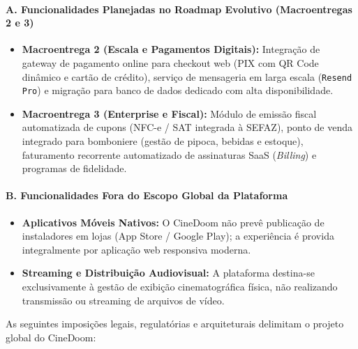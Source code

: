 \paragraph{A. Funcionalidades Planejadas no Roadmap Evolutivo (Macroentregas 2 e 3)}
\begin{itemize}
\tightlist
\item \textbf{Macroentrega 2 (Escala e Pagamentos Digitais):} Integração de gateway de pagamento online para checkout web (PIX com QR Code dinâmico e cartão de crédito), serviço de mensageria em larga escala (\texttt{Resend Pro}) e migração para banco de dados dedicado com alta disponibilidade.
\item \textbf{Macroentrega 3 (Enterprise e Fiscal):} Módulo de emissão fiscal automatizada de cupons (NFC-e / SAT integrada à SEFAZ), ponto de venda integrado para bomboniere (gestão de pipoca, bebidas e estoque), faturamento recorrente automatizado de assinaturas SaaS (\emph{Billing}) e programas de fidelidade.
\end{itemize}

\paragraph{B. Funcionalidades Fora do Escopo Global da Plataforma}
\begin{itemize}
\tightlist
\item \textbf{Aplicativos Móveis Nativos:} O CineDoom não prevê publicação de instaladores em lojas (App Store / Google Play); a experiência é provida integralmente por aplicação web responsiva moderna.
\item \textbf{Streaming e Distribuição Audiovisual:} A plataforma destina-se exclusivamente à gestão de exibição cinematográfica física, não realizando transmissão ou streaming de arquivos de vídeo.
\end{itemize}



As seguintes imposições legais, regulatórias e arquiteturais delimitam o projeto global do CineDoom:

